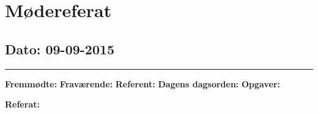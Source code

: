 \chapter{Mødereferat}

\section{Dato: 09-09-2015}
\hrule
\textbf{Fremmødte:} 
\textbf{Fraværende:} 
\textbf{Referent:} 
\textbf{Dagens dagsorden:}
\textbf{Opgaver:} \newline

\textbf{Referat:}


\newpage


